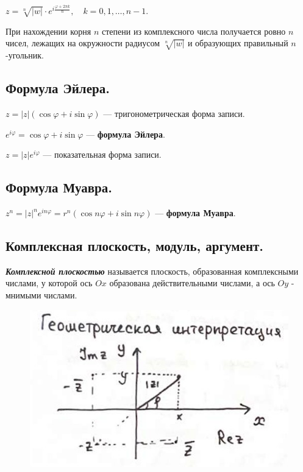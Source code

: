$z = \sqrt[n]{|w|} \cdot e^{i \frac{\varphi + 2 \pi k}{n}}, \quad k = 0, 1, \ldots, n - 1.$

При нахождении корня $n$ степени из комплексного числа получается ровно $n$ чисел, лежащих на окружности радиусом $\sqrt[n]{|w|}$ и образующих правильный $n$-угольник.

\subsection{
    Формула Эйлера.
}

$z = |z|(\cos \varphi + i \sin \varphi)$ — тригонометрическая форма записи.

$e^{i\varphi} = \cos \varphi + i \sin \varphi$ — \textbf{формула Эйлера}.

$z = |z|e^{i\varphi}$ — показательная форма записи.


\subsection{
    Формула Муавра.
}

$z^n = |z|^n e^{in\varphi} = r^n(\cos n \varphi + i \sin n \varphi)$ — \textbf{формула Муавра}.


\newpage


\subsection{
    Комплексная плоскость, модуль, аргумент.
}

\begin{definition}
    \textbf{\textit{Комплексной плоскостью}} называется плоскость, образованная комплексными числами, у которой ось $Ox$ образована действительными числами, а ось $Oy$ - мнимыми числами.
\end{definition}

\begin{figure}[H]
    \centering
    \includegraphics[scale=0.55]{images/1_1.jpg}
    \label{fig:picture_1_1}
\end{figure}


